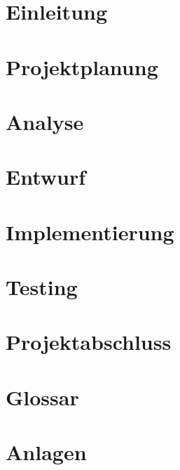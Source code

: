 \documentclass[11pt]{article}
\begin{document}

    
    \newpage
    \tableofcontents
    \newpage
    \section{Einleitung}
    
    \pagebreak
    \section{Projektplanung}
    
    \pagebreak
    \section{Analyse}
    
    \pagebreak
    \section{Entwurf}
    
    \pagebreak
    \section{Implementierung}
    
    \pagebreak
    \section{Testing}
    
    \pagebreak
    \section{Projektabschluss}
    

    \clearpage
    \pagestyle{plain} %
    \section{Glossar}
    
    \pagebreak
    \section{Anlagen}
    \pagebreak
    
\end{document}
